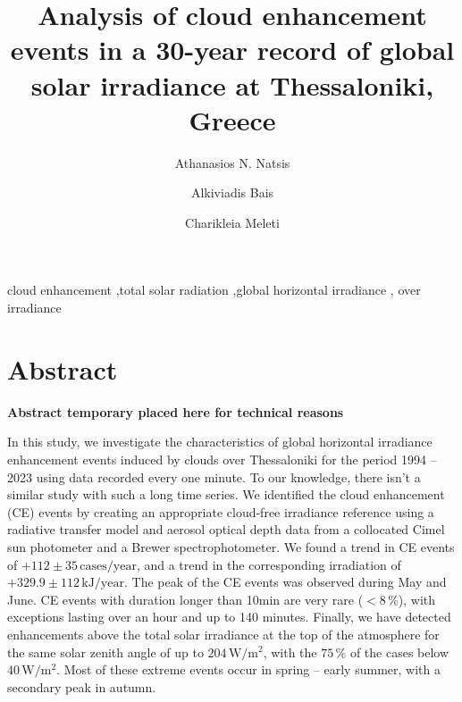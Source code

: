 \documentclass[preprint, 5p,
authoryear]{elsarticle} %
\begin{document}
\begin{frontmatter}

  \title{Analysis of cloud enhancement events in a 30-year record of
global solar irradiance at Thessaloniki, Greece}
    \author[LAP]{Athanasios N. Natsis%
  }
    \author[LAP]{Alkiviadis Bais%
  }
    \author[LAP]{Charikleia Meleti%
  }
  
  \begin{abstract}
  
  \end{abstract}
    \begin{keyword}
    cloud enhancement \sep total solar radiation \sep global horizontal
irradiance \sep 
    over irradiance
  \end{keyword}
  
 \end{frontmatter}

\hypertarget{abstract}{%
\section*{Abstract}\label{abstract}}

\textbf{Abstract temporary placed here for technical reasons}

In this study, we investigate the characteristics of global horizontal
irradiance enhancement events induced by clouds over Thessaloniki for
the period 1994 -- 2023 using data recorded every one minute. To our
knowledge, there isn't a similar study with such a long time series. We
identified the cloud enhancement (CE) events by creating an appropriate
cloud-free irradiance reference using a radiative transfer model and
aerosol optical depth data from a collocated Cimel sun photometer and a
Brewer spectrophotometer. We found a trend in CE events of
\(+112\pm 35\,\text{cases}/\text{year}\), and a trend in the
corresponding irradiation of \(+329.9\pm 112\,\text{kJ}/\text{year}\).
The peak of the CE events was observed during May and June. CE events
with duration longer than 10\nobreakspace{}min are very rare
(\(<8\,\%\)), with exceptions lasting over an hour and up to 140
minutes. Finally, we have detected enhancements above the total solar
irradiance at the top of the atmosphere for the same solar zenith angle
of up to \(204\,\text{W}/\text{m}^{2}\), with the \(75\,\%\) of the
cases below \(40\,\text{W}/\text{m}^{2}\). Most of these extreme events
occur in spring -- early summer, with a secondary peak in autumn.
\end{document}
